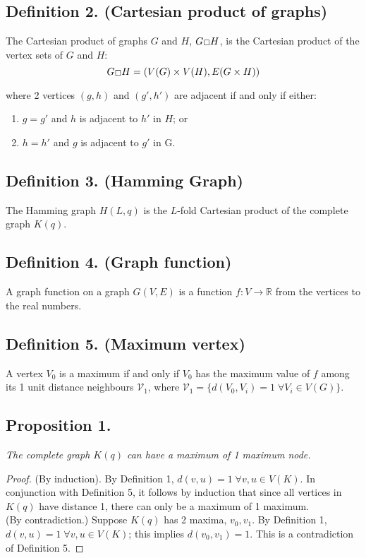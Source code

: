 \documentclass[10pt, reqno]{amsart}
\theoremstyle{plain}
\theoremstyle{definition}
\def\msquare{\mathord{\scalebox{0.35}[0.35]{\scalerel*{\Box}{\strut}}}}
\begin{document}
\subsection*{Definition 2. (Cartesian product of graphs)} The Cartesian product of graphs $G$ and $H$, $G \msquare H$, is the Cartesian product of the vertex sets of $G$ and $H$: 
$$G \msquare H = (V(G) \times V(H), E (G \times H)) $$

where 2 vertices $(g,h)$ and $(g',h')$ are adjacent if and only if either: 
\begin{enumerate}
\item $g = g'$ and $h$ is adjacent to $h'$ in $H$; or
\item $h=h'$ and $g$ is adjacent to $g'$ in G.
\end{enumerate}



\subsection*{Definition 3. (Hamming Graph)} The Hamming graph $H(L, q)$ is the $L$-fold Cartesian product of the complete graph $K(q)$. 

\subsection*{Definition 4. (Graph function)} A graph function on a graph $G(V,E)$ is a function $f: V \rightarrow \mathbb{R}$ from the vertices to the real numbers.  


\subsection*{Definition 5. (Maximum vertex)} A vertex $V_0$ is a maximum if and only if $V_0$ has the maximum value of $f$ among its 1 unit distance neighbours $\mathcal{V}_1$, where $\mathcal{V}_1 = \{d(V_0, V_i)=1 \; \forall V_i \in V(G)\}$. 

\subsection*{Proposition 1.} \textit{The complete graph $K(q)$ can have a maximum of 1 maximum node.}

\begin{proof} (By induction). By Definition 1, $d(v,u) = 1 \; \forall v, u \in V(K)$. In conjunction with Definition 5, it follows by induction that since all vertices in $K(q)$ have distance 1, there can only be a maximum of 1 maximum. \\

(By contradiction.) Suppose $K(q)$ has 2 maxima, $v_0, v_1$. By Definition 1, $d(v,u) = 1 \; \forall v, u \in V(K)$; this implies $d(v_0, v_1)=1$. This is a contradiction of Definition 5. 
\end{proof}
\end{document}
